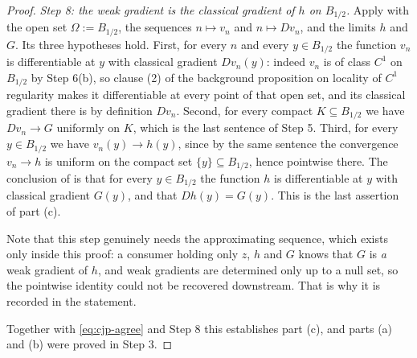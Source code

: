 \begin{proof}
\medskip\noindent\emph{Step 8: the weak gradient is the classical gradient of $h$ on
$B_{1/2}$.}
Apply  with the open set $\Omega:=B_{1/2}$, the sequences
$n\mapsto v_n$ and $n\mapsto Dv_n$, and the limits $h$ and $G$.  Its three hypotheses hold.
First, for every $n$ and every $y\in B_{1/2}$ the function $v_n$ is differentiable at $y$ with
classical gradient $Dv_n(y)$: indeed $v_n$ is of class $C^{1}$ on $B_{1/2}$ by Step 6(b), so
clause (2) of the background proposition on locality of $C^{1}$ regularity makes it
differentiable at every point of that open set, and its classical gradient there is by
definition $Dv_n$.  Second, for every compact $K\subseteq B_{1/2}$ we have $Dv_n\to G$
uniformly on $K$, which is the last sentence of Step 5.  Third, for every $y\in B_{1/2}$ we have
$v_n(y)\to h(y)$, since by the same sentence the convergence $v_n\to h$ is uniform on the
compact set $\{y\}\subseteq B_{1/2}$, hence pointwise there.  The conclusion of
 is that for every $y\in B_{1/2}$ the function $h$ is
differentiable at $y$ with classical gradient $G(y)$, and that $Dh(y)=G(y)$.  This is the last
assertion of part (c).

Note that this step genuinely needs the approximating sequence, which exists only inside this
proof: a consumer holding only $z$, $h$ and $G$ knows that $G$ is \emph{a} weak gradient of $h$,
and weak gradients are determined only up to a null set, so the pointwise identity could not be
recovered downstream.  That is why it is recorded in the statement.

\medskip\noindent Together with \eqref{eq:cjp-agree} and Step 8 this establishes part (c), and
parts (a) and (b) were proved in Step 3.
\end{proof}
